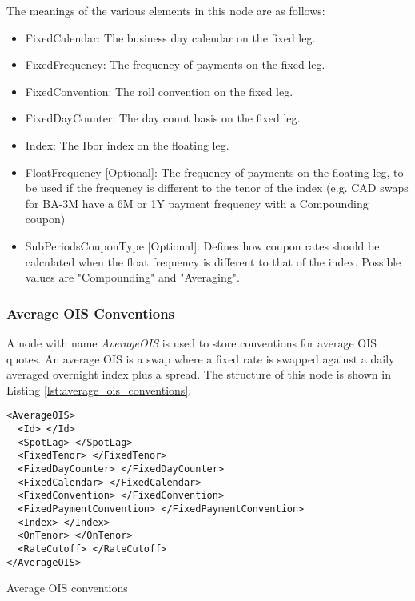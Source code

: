 The meanings of the various elements in this node are as follows:
\begin{itemize}
\item FixedCalendar: The business day calendar on the fixed leg.
\item FixedFrequency: The frequency of payments on the fixed leg.
\item FixedConvention: The roll convention on the fixed leg.
\item FixedDayCounter: The day count basis on the fixed leg.
\item Index: The Ibor index on the floating leg.
\item FloatFrequency [Optional]: The frequency of payments on the floating leg, to be used if the frequency is different to the tenor of the index (e.g. CAD swaps for BA-3M have a 6M or 1Y payment frequency with a Compounding coupon)
\item SubPeriodsCouponType [Optional]: Defines how coupon rates should be calculated when the float frequency is different to that of the index. Possible values are "Compounding" and "Averaging".
\end{itemize}

\subsubsection{Average OIS Conventions}
A node with name \emph{AverageOIS} is used to store conventions for average OIS quotes. An average OIS is a swap where a
fixed rate is swapped against a daily averaged overnight index plus a spread. The structure of this node is shown in
Listing \ref{lst:average_ois_conventions}.

\begin{listing}[H]
\begin{verbatim}
<AverageOIS>
  <Id> </Id>
  <SpotLag> </SpotLag>
  <FixedTenor> </FixedTenor>
  <FixedDayCounter> </FixedDayCounter>
  <FixedCalendar> </FixedCalendar>
  <FixedConvention> </FixedConvention>
  <FixedPaymentConvention> </FixedPaymentConvention>
  <Index> </Index>
  <OnTenor> </OnTenor>
  <RateCutoff> </RateCutoff>
</AverageOIS>
\end{verbatim}
\caption{Average OIS conventions}
\label{lst:average_ois_conventions}
\end{listing}



